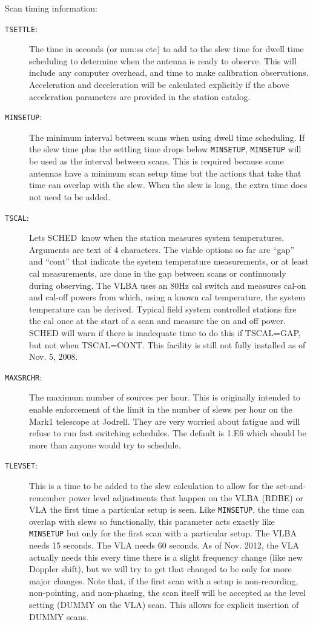\documentclass{report}
\newcommand{\schedb}{{\sc SCHED~}}
\begin{document}
Scan timing information:

\begin{description}

\item [{\tt TSETTLE}:] The time in seconds (or mm:ss etc) to add to
the slew time for dwell time scheduling to determine when the antenna
is ready to observe.  This will include any computer overhead,
and time to make calibration observations.  Acceleration and
deceleration will be calculated explicitly if the above acceleration
parameters are provided in the station catalog.

\item [{\tt MINSETUP}:] The minimum interval between scans when using
dwell time scheduling.  If the slew time plus the settling time
drops below {\tt MINSETUP}, {\tt MINSETUP} will be used as the
interval between scans.  This is required because some antennas have
a minimum scan setup time but the actions that take that time can
overlap with the slew.  When the slew is long, the extra time does
not need to be added.

\item [{\tt TSCAL}:] Lets \schedb know when the station measures
system temperatures.  Arguments are text of 4 characters.  The viable
options so far are ``gap'' and ``cont'' that indicate the system temperature
measurements, or at least cal measurements, are done in the gap between
scans or continuously during observing.  The VLBA uses an 80Hz cal switch
and measures cal-on and cal-off powers from which, using a known cal
temperature, the system temperature can be derived.  Typical field system
controlled stations fire the cal once at the start of a scan and measure
the on and off power.  {\sc SCHED} will warn if there is inadequate time to
do this if TSCAL=GAP, but not when TSCAL=CONT.  This facility is still
not fully installed as of Nov. 5, 2008.

\item [{\tt MAXSRCHR}:] The maximum number of sources per hour.
This is originally intended to enable enforcement of the limit in
the number of slews per hour on the Mark1 telescope at Jodrell.  They
are very worried about fatigue and will refuse to run fast switching
schedules.  The default is 1.E6 which should be more than anyone
would try to schedule.

\item [{\tt TLEVSET}:] This is a time to be added to the slew
calculation to allow for the set-and-remember power level adjustments
that happen on the VLBA (RDBE) or VLA the first time a particular
setup is seen.  Like {\tt MINSETUP}, the time can overlap with slews
so functionally, this parameter acts exactly like {\tt MINSETUP} but
only for the first scan with a particular setup.  The VLBA needs 15
seconds.  The VLA needs 60 seconds.  As of Nov. 2012, the VLA actually
needs this every time there is a slight frequency change (like new
Doppler shift), but we will try to get that changed to be only for
more major changes.  Note that, if the first scan with a setup is
non-recording, non-pointing, and non-phasing, the scan itself will be
accepted as the level setting (DUMMY on the VLA) scan.  This allows
for explicit insertion of DUMMY scans.



\end{description}
\end{document}
